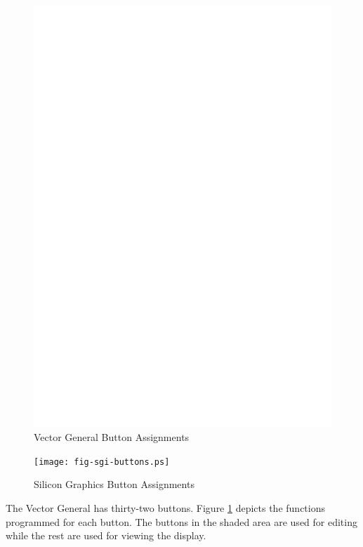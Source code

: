 \begin{figure}
\centering \includegraphics{fig-vg-buttons.ps}
\caption{Vector General Button Assignments}
\label{vg-buttons}
\end{figure}

\begin{figure}
\centering \texttt{[image: fig-sgi-buttons.ps]}
\caption{Silicon Graphics Button Assignments}
\label{sgi-buttons}
\end{figure}

The Vector General has thirty-two buttons.
Figure \ref{vg-buttons} depicts the functions programmed
for each button.
The buttons in the shaded area are used for editing while the
rest are used for viewing the display.

